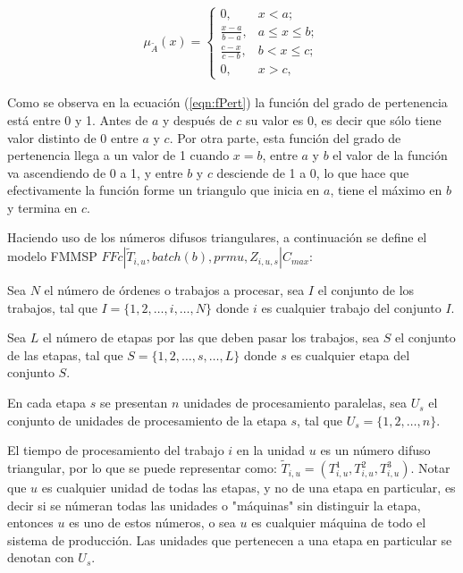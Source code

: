\documentclass{article}
\def\notac_modelo{$FFc | \tilde{T}_{i, u}, batch(b), prmu, Z_{i, u, s} | C_{max}$}
\begin{document}
\begin{align}
    \label{eqn:fPert}
    \mu_{\tilde{A}}(x) =
    \begin{cases}
        0,   & x < a;\\
        \frac{x-a}{b-a},   & a \leq x \leq b;\\
        \frac{c-x}{c-b},   & b < x \leq c;\\
        0,   & x > c,
    \end{cases}
\end{align}

Como se observa en la ecuación (\ref{eqn:fPert}) la función del grado de pertenencia está entre 0 y 1. Antes de $a$ y después de $c$ su valor es 0, es decir que sólo tiene valor distinto de 0 entre $a$ y $c$. Por otra parte, esta función del grado de pertenencia llega a un valor de 1 cuando $x = b$, entre $a$ y $b$ el valor de la función va ascendiendo de 0 a 1, y entre $b$ y $c$ desciende de 1 a 0, lo que hace que efectivamente la función forme un triangulo que inicia en $a$, tiene el máximo en $b$ y termina en $c$. \autocite{fuzzyNum}

\vspace{\baselineskip}
Haciendo uso de los números difusos triangulares, a continuación se define el modelo FMMSP \notac_modelo: \autocite{modFMMSP}

\vspace{\baselineskip}
Sea $N$ el número de órdenes o trabajos a procesar, sea $I$ el conjunto de los trabajos, tal que $I = \{1,2,\dots,i,\dots,N\}$ donde $i$ es cualquier trabajo del conjunto $I$.

\vspace{\baselineskip}
Sea $L$ el número de etapas por las que deben pasar los trabajos, sea $S$ el conjunto de las etapas, tal que $S = \{1,2,\dots,s,\dots,L\}$ donde $s$ es cualquier etapa del conjunto $S$.

\vspace{\baselineskip}
En cada etapa $s$ se presentan $n$ unidades de procesamiento paralelas, sea $U_s$ el conjunto de unidades de procesamiento de la etapa $s$, tal que $U_s = \{1,2,\dots,n\}$.

\vspace{\baselineskip}
El tiempo de procesamiento del trabajo $i$ en la unidad $u$ es un número difuso triangular, por lo que se puede representar como: $\tilde{T}_{i,u} = (T_{i,u}^{1},T_{i,u}^{2},T_{i,u}^{3})$. Notar que $u$ es cualquier unidad de todas las etapas, y no de una etapa en particular, es decir si se númeran todas las unidades o "máquinas" sin distinguir la etapa, entonces $u$ es uno de estos números, o sea $u$ es cualquier máquina de todo el sistema de producción. Las unidades que pertenecen a una etapa en particular se denotan con $U_s$.
\end{document}
